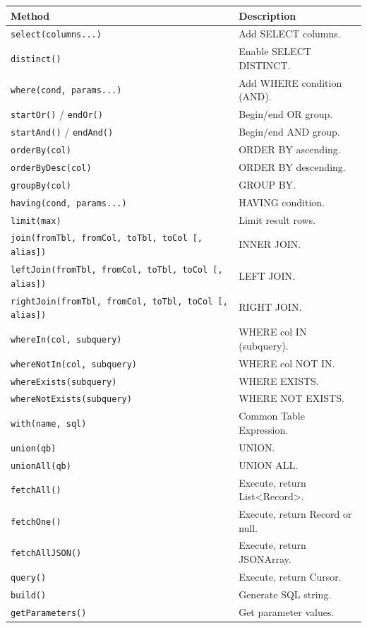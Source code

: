 \begin{longtable}{P{4.8cm}P{5.7cm}}
\toprule
\textbf{Method} & \textbf{Description} \\
\midrule
\endhead
\texttt{select(columns...)} & Add SELECT columns. \\
\texttt{distinct()} & Enable SELECT DISTINCT. \\
\texttt{where(cond, params...)} & Add WHERE condition (AND). \\
\texttt{startOr()} / \texttt{endOr()} & Begin/end OR group. \\
\texttt{startAnd()} / \texttt{endAnd()} & Begin/end AND group. \\
\texttt{orderBy(col)} & ORDER BY ascending. \\
\texttt{orderByDesc(col)} & ORDER BY descending. \\
\texttt{groupBy(col)} & GROUP BY. \\
\texttt{having(cond, params...)} & HAVING condition. \\
\texttt{limit(max)} & Limit result rows. \\
\texttt{join(fromTbl, fromCol, toTbl, toCol [, alias])} & INNER JOIN. \\
\texttt{leftJoin(fromTbl, fromCol, toTbl, toCol [, alias])} & LEFT JOIN. \\
\texttt{rightJoin(fromTbl, fromCol, toTbl, toCol [, alias])} & RIGHT JOIN. \\
\texttt{whereIn(col, subquery)} & WHERE col IN (subquery). \\
\texttt{whereNotIn(col, subquery)} & WHERE col NOT IN. \\
\texttt{whereExists(subquery)} & WHERE EXISTS. \\
\texttt{whereNotExists(\allowbreak subquery)} & WHERE NOT EXISTS. \\
\texttt{with(name, sql)} & Common Table Expression. \\
\texttt{union(qb)} & UNION. \\
\texttt{unionAll(qb)} & UNION ALL. \\
\texttt{fetchAll()} & Execute, return List<Record>. \\
\texttt{fetchOne()} & Execute, return Record or null. \\
\texttt{fetchAllJSON()} & Execute, return JSONArray. \\
\texttt{query()} & Execute, return Cursor. \\
\texttt{build()} & Generate SQL string. \\
\texttt{getParameters()} & Get parameter values. \\
\bottomrule
\end{longtable}

